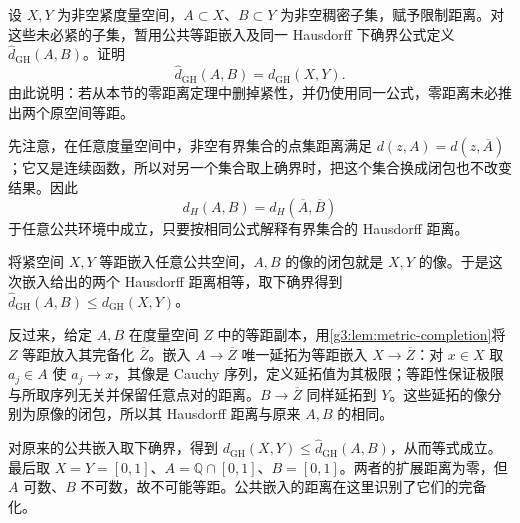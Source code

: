 \begin{exercise}\label{g3:ex:gh-dense-subsets}
	设 \(X,Y\) 为非空紧度量空间，\(A\subset X\)、\(B\subset Y\) 为非空稠密子集，赋予限制距离。对这些未必紧的子集，暂用公共等距嵌入及同一 Hausdorff 下确界公式定义 \(\widehat d_{\mathrm{GH}}(A,B)\)。证明
	\[
		\widehat d_{\mathrm{GH}}(A,B)=d_{\mathrm{GH}}(X,Y).
	\]
	由此说明：若从本节的零距离定理中删掉紧性，并仍使用同一公式，零距离未必推出两个原空间等距。
\end{exercise}
\begin{solution}
	先注意，在任意度量空间中，非空有界集合的点集距离满足 \(d(z,A)=d(z,\overline A)\)；它又是连续函数，所以对另一个集合取上确界时，把这个集合换成闭包也不改变结果。因此
	\[
		d_H(A,B)=d_H(\overline A,\overline B)
	\]
	于任意公共环境中成立，只要按相同公式解释有界集合的 Hausdorff 距离。

	将紧空间 \(X,Y\) 等距嵌入任意公共空间，\(A,B\) 的像的闭包就是 \(X,Y\) 的像。于是这次嵌入给出的两个 Hausdorff 距离相等，取下确界得到 \(\widehat d_{\mathrm{GH}}(A,B)\le d_{\mathrm{GH}}(X,Y)\)。

	反过来，给定 \(A,B\) 在度量空间 \(Z\) 中的等距副本，用\cref{g3:lem:metric-completion}将 \(Z\) 等距放入其完备化 \(\overline Z\)。嵌入 \(A\to\overline Z\) 唯一延拓为等距嵌入 \(X\to\overline Z\)：对 \(x\in X\) 取 \(a_j\in A\) 使 \(a_j\to x\)，其像是 Cauchy 序列，定义延拓值为其极限；等距性保证极限与所取序列无关并保留任意点对的距离。\(B\to\overline Z\) 同样延拓到 \(Y\)。这些延拓的像分别为原像的闭包，所以其 Hausdorff 距离与原来 \(A,B\) 的相同。


	对原来的公共嵌入取下确界，得到 \(d_{\mathrm{GH}}(X,Y)\le\widehat d_{\mathrm{GH}}(A,B)\)，从而等式成立。最后取 \(X=Y=[0,1]\)、\(A=\mathbb Q\cap[0,1]\)、\(B=[0,1]\)。两者的扩展距离为零，但 \(A\) 可数、\(B\) 不可数，故不可能等距。公共嵌入的距离在这里识别了它们的完备化。
\end{solution}

